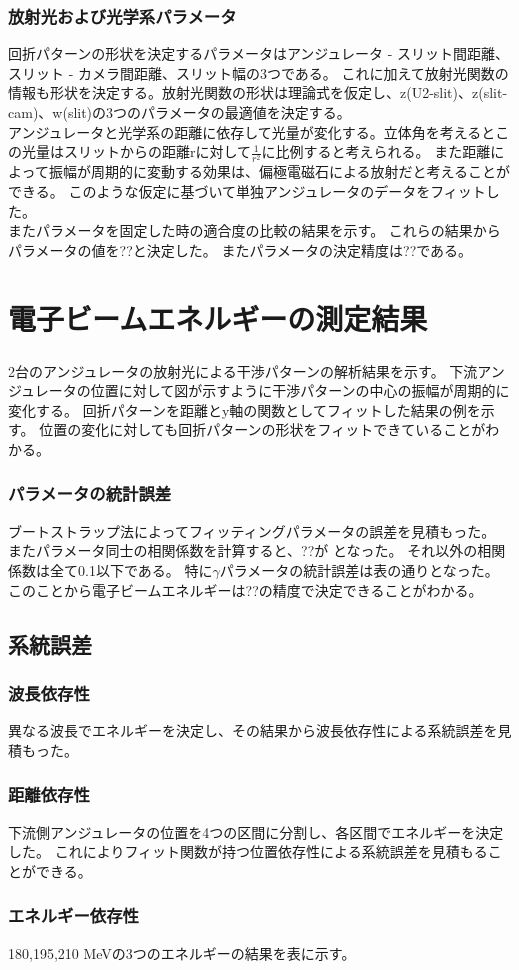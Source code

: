 \documentclass[a4paper,11pt,uplatex]{jsbook}
\begin{document}
\subsubsection{放射光および光学系パラメータ}
回折パターンの形状を決定するパラメータはアンジュレータ - スリット間距離、スリット - カメラ間距離、スリット幅の3つである。
これに加えて放射光関数の情報も形状を決定する。放射光関数の形状は理論式を仮定し、z(U2-slit)、z(slit-cam)、w(slit)の3つのパラメータの最適値を決定する。\\
アンジュレータと光学系の距離に依存して光量が変化する。立体角を考えるとこの光量はスリットからの距離rに対して$\frac{1}{r^2}$に比例すると考えられる。
また距離によって振幅が周期的に変動する効果は、偏極電磁石による放射だと考えることができる。
このような仮定に基づいて単独アンジュレータのデータをフィットした。\\
またパラメータを固定した時の適合度の比較の結果を示す。
これらの結果からパラメータの値を??と決定した。
またパラメータの決定精度は??である。
\section{電子ビームエネルギーの測定結果}
\subsubsection{}
2台のアンジュレータの放射光による干渉パターンの解析結果を示す。
下流アンジュレータの位置に対して図が示すように干渉パターンの中心の振幅が周期的に変化する。
回折パターンを距離とy軸の関数としてフィットした結果の例を示す。
位置の変化に対しても回折パターンの形状をフィットできていることがわかる。
\subsubsection{パラメータの統計誤差}
ブートストラップ法によってフィッティングパラメータの誤差を見積もった。
またパラメータ同士の相関係数を計算すると、??が となった。
それ以外の相関係数は全て0.1以下である。
特に$\gamma$パラメータの統計誤差は表の通りとなった。
このことから電子ビームエネルギーは??の精度で決定できることがわかる。
\subsection{系統誤差}
\subsubsection{波長依存性}
異なる波長でエネルギーを決定し、その結果から波長依存性による系統誤差を見積もった。
\subsubsection{距離依存性}
下流側アンジュレータの位置を4つの区間に分割し、各区間でエネルギーを決定した。
これによりフィット関数が持つ位置依存性による系統誤差を見積もることができる。

\subsubsection{エネルギー依存性}
180,195,210 MeVの3つのエネルギーの結果を表に示す。
\end{document}
